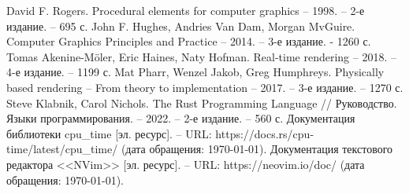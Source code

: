 \begin{thebibliography}{}
	 David F. Rogers. Procedural elements for computer graphics  -- 1998. -- 2-е издание. -- 695 с.
	 John F. Hughes, Andries Van Dam, Morgan MvGuire. Computer Graphics Principles and Practice -- 2014. -- 3-е издание. - 1260 с.
	 Tomas Akenine-Möler, Eric Haines, Naty Hofman. Real-time rendering -- 2018. -- 4-е издание. -- 1199 с.
	 Mat Pharr, Wenzel Jakob, Greg Humphreys. Physically based rendering -- From theory to implementation -- 2017. -- 3-е издание. -- 1270 с. 
	 Steve Klabnik, Carol Nichols. The Rust Programming Language // Руководство. Языки программирования. -- 2022. -- 2-е издание. -- 560 с.
	 Документация библиотеки cpu\_time [эл. ресурс]. -- URL: https://docs.rs/cpu-time/latest/cpu\_time/ (дата обращения:  \today).
	 Документация текстового редактора <<NVim>> [эл. ресурс]. -- URL: https://neovim.io/doc/ (дата обращения:  \today).
\end{thebibliography}



